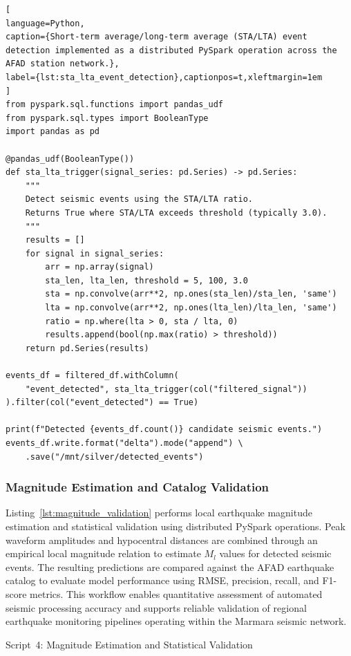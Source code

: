 \documentclass[data,article,accept,pdftex,moreauthors]{Definitions/mdpi}
\begin{document}
\begin{lstlisting}[
language=Python,
caption={Short-term average/long-term average (STA/LTA) event detection implemented as a distributed PySpark operation across the AFAD station network.},
label={lst:sta_lta_event_detection},captionpos=t,xleftmargin=1em
]
from pyspark.sql.functions import pandas_udf
from pyspark.sql.types import BooleanType
import pandas as pd

@pandas_udf(BooleanType())
def sta_lta_trigger(signal_series: pd.Series) -> pd.Series:
    """
    Detect seismic events using the STA/LTA ratio.
    Returns True where STA/LTA exceeds threshold (typically 3.0).
    """
    results = []
    for signal in signal_series:
        arr = np.array(signal)
        sta_len, lta_len, threshold = 5, 100, 3.0
        sta = np.convolve(arr**2, np.ones(sta_len)/sta_len, 'same')
        lta = np.convolve(arr**2, np.ones(lta_len)/lta_len, 'same')
        ratio = np.where(lta > 0, sta / lta, 0)
        results.append(bool(np.max(ratio) > threshold))
    return pd.Series(results)

events_df = filtered_df.withColumn(
    "event_detected", sta_lta_trigger(col("filtered_signal"))
).filter(col("event_detected") == True)

print(f"Detected {events_df.count()} candidate seismic events.")
events_df.write.format("delta").mode("append") \
    .save("/mnt/silver/detected_events")
\end{lstlisting}

\subsubsection{Magnitude Estimation and Catalog Validation}

Listing~\ref{lst:magnitude_validation} performs local earthquake magnitude estimation and statistical validation using distributed PySpark operations. Peak waveform amplitudes and hypocentral distances are combined through an empirical local magnitude relation to estimate $M_l$ values for detected seismic events. The resulting predictions are compared against the AFAD earthquake catalog to evaluate model performance using RMSE, precision, recall, and F1-score metrics. This workflow enables quantitative assessment of automated seismic processing accuracy and supports reliable validation of regional earthquake monitoring pipelines operating within the Marmara seismic network.

Script~4: Magnitude Estimation and Statistical Validation
\end{document}
